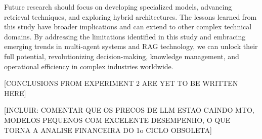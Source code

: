     Future research should focus on developing specialized models, advancing retrieval techniques, and exploring hybrid architectures. The lessons learned from this study have broader implications and can extend to other complex technical domains. By addressing the limitations identified in this study and embracing emerging trends in multi-agent systems and RAG technology, we can unlock their full potential, revolutionizing decision-making, knowledge management, and operational efficiency in complex industries worldwide.



    [CONCLUSIONS FROM EXPERIMENT 2 ARE YET TO BE WRITTEN HERE]

    [INCLUIR: COMENTAR QUE OS PRECOS DE LLM ESTAO CAINDO MTO, MODELOS PEQUENOS COM EXCELENTE DESEMPENHO, O QUE TORNA A ANALISE FINANCEIRA DO 1o CICLO OBSOLETA]